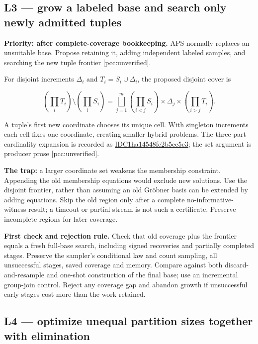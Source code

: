 \documentclass[
  10pt,
]{article}
\begin{document}
\subsection{L3 --- grow a labeled base and search only newly admitted
tuples}\label{l3-grow-a-labeled-base-and-search-only-newly-admitted-tuples}

\textbf{Priority: after complete-coverage bookkeeping.} APS normally
replaces an unsuitable base. Propose retaining it, adding independent
labeled samples, and searching the new tuple frontier
{[}pcc:unverified{]}.

For disjoint increments \(\Delta_i\) and \(T_i=S_i\cup\Delta_i\), the
proposed disjoint cover is

\[\left(\prod_i T_i\right)\setminus\left(\prod_i S_i\right)
=\bigsqcup_{j=1}^{m}
\left(\prod_{i<j}S_i\right)\times\Delta_j\times
\left(\prod_{i>j}T_i\right).\]

A tuple's first new coordinate chooses its unique cell. With singleton
increments each cell fixes one coordinate, creating smaller hybrid
problems. The three-part cardinality expansion is recorded as
\href{certificates/frontier-count.json}{IDC1ha14548fc2b5ce5c3}; the set
argument is producer prose {[}pcc:unverified{]}.

\textbf{The trap:} a larger coordinate set weakens the membership
constraint. Appending the old membership equations would exclude new
solutions. Use the disjoint frontier, rather than assuming an old
Gröbner basis can be extended by adding equations. Skip the old region
only after a complete no-informative-witness result; a timeout or
partial stream is not such a certificate. Preserve incomplete regions
for later coverage.

\textbf{First check and rejection rule.} Check that old coverage plus
the frontier equals a fresh full-base search, including signed
recoveries and partially completed stages. Preserve the sampler's
conditional law and count sampling, all unsuccessful stages, saved
coverage and memory. Compare against both discard-and-resample and
one-shot construction of the final base; use an incremental group-join
control. Reject any coverage gap and abandon growth if unsuccessful
early stages cost more than the work retained.

\subsection{L4 --- optimize unequal partition sizes together with
elimination}\label{l4-optimize-unequal-partition-sizes-together-with-elimination}
\end{document}
